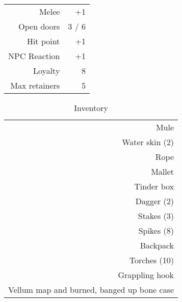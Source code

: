 \documentclass[a4paper]{article}
\begin{document}
\begin{multicols}{2}
\begin{table}[H]
\begin{center}
    \begin{tabular}{r|r} %
      Melee & +1\\
      Open doors & 3 / 6\\
      Hit point & +1\\
      NPC Reaction & +1\\
      Loyalty & 8\\
      Max retainers & 5\\
    \end{tabular}
  \end{center}
\end{table}
\begin{table}[H]
  \begin{center}
    \caption*{Inventory}
    \begin{tabular}{r} %
      Mule\\
      Water skin (2)\\
      Rope\\
      Mallet\\
      Tinder box\\
      Dagger (2)\\
      Stakes (3)\\
      Spikes (8)\\
      Backpack\\
      Torches (10)\\
      Grappling hook\\
      Vellum map and burned, banged up bone case\\
    \end{tabular}
  \end{center}
\end{table}


\end{multicols}
\end{document}
